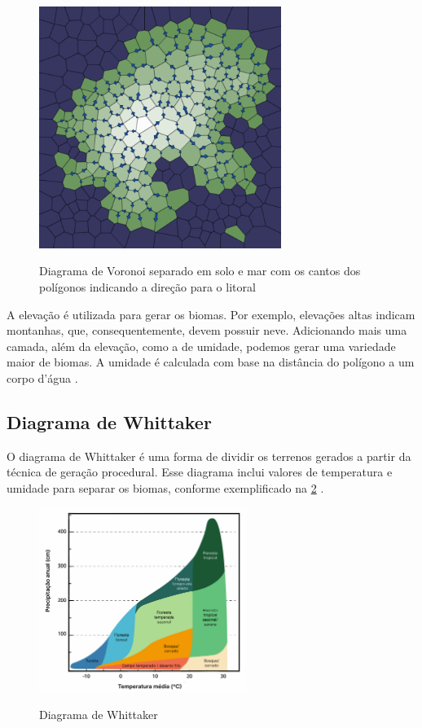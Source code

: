 \begin{figure}[ht]
	\caption{Diagrama de Voronoi separado em solo e mar com os cantos dos polígonos indicando a direção para o litoral}
	\centering
	\includegraphics[width=0.7\textwidth]{figures/downslopes.png}
	\label{fig:downslopes}
\end{figure}

A elevação é utilizada para gerar os biomas. Por exemplo, elevações altas indicam montanhas, que, consequentemente, devem possuir neve. Adicionando mais uma camada, além da elevação, como a de umidade, podemos gerar uma variedade maior de biomas. A umidade é calculada com base na distância do polígono a um corpo d'água \cite{amitp2010}.

\subsection*{Diagrama de Whittaker}

O diagrama de Whittaker é uma forma de dividir os terrenos gerados a partir da técnica de geração procedural. Esse diagrama inclui valores de temperatura e umidade para separar os biomas, conforme exemplificado na \cref{fig:diagrama-whittaker} \cite{wikidotwhittakerdiagram}.

\begin{figure}[ht]
	\caption{Diagrama de Whittaker}
	\centering
	\includegraphics[width=0.6\textwidth]{figures/diagrama-whittaker.png}
	\label{fig:diagrama-whittaker}
\end{figure}


